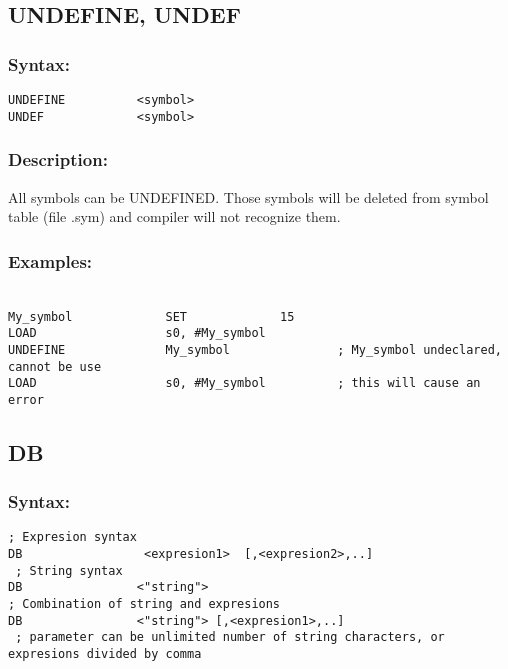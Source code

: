     \subsection{UNDEFINE, UNDEF}

        \subsubsection{Syntax:}
        \verb'UNDEFINE          <symbol>'\\
        \verb'UNDEF             <symbol>'
        \subsubsection{Description:}
        All symbols can be UNDEFINED. Those symbols will be deleted from symbol table (file .sym) and compiler will not recognize them.

        \subsubsection{Examples:}
        {
            ~\\
            \usecodefont
            \verb'My_symbol             SET             15'\\
            \verb'LOAD                  s0, #My_symbol'\\
            \verb'UNDEFINE              My_symbol               ; My_symbol undeclared, cannot be use'\\
            \verb'LOAD                  s0, #My_symbol          ; this will cause an error'\\
        }

    \subsection{DB}
        \subsubsection{Syntax:}
            \verb '; Expresion syntax'\\
            \verb'DB                 <expresion1>  [,<expresion2>,..]'\\
            \verb' ; String syntax'\\
            \verb'DB                <"string">'\\
            \verb'; Combination of string and expresions'\\
            \verb'DB                <"string"> [,<expresion1>,..]'\\
            \verb' ; parameter can be unlimited number of string characters, or expresions divided by comma'\\

